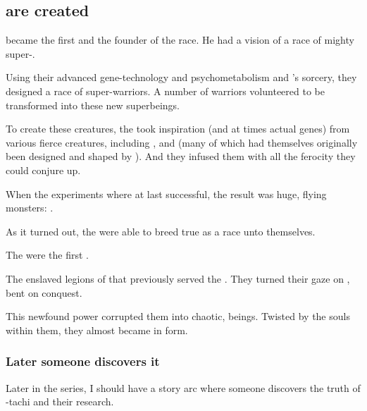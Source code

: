 \subsection{\Dragons are created}
\Sethicus became the first \dragon and the founder of the \draconian race.
He had a vision of a race of mighty super-\ophidians.

Using their advanced gene-technology and psychometabolism and \Sethicus's \xsic{} sorcery, they designed a race of \ophidian{} super-warriors. 
A number of \ophidian{} warriors volunteered to be transformed into these new superbeings. 

To create these creatures, the \ophidians{} took inspiration (and at times actual genes) from various fierce creatures, including \nycans, \corgoroth{} and \vreiiden{} (many of which had themselves originally been designed and shaped by \ophidians). 
And they infused them with all the \xsic{} ferocity they could conjure up. 

When the experiments where at last successful, the result was huge, flying monsters: 
\Dragons. 

As it turned out, the \dragons{} were able to breed true as a race unto themselves. 

The \dragons were the first . 

The \dragons{} enslaved legions of \daemons{} that previously served the \xzaishanns. 
They turned their gaze on \Miith{}, bent on conquest.


This newfound power corrupted them into chaotic, \daemonic{} beings. Twisted by the \xzaishannic{} souls within them, they almost became \xzaishanns{} in \ophidian{} form. 





\subsubsection{Later someone discovers it}
Later in the series, I should have a story arc where someone discovers the truth of \Sethicus-tachi and their research. 


